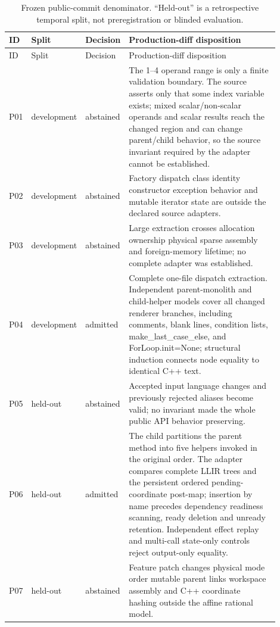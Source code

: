 \begin{longtable}{@{}p{0.055\linewidth}p{0.13\linewidth}p{0.13\linewidth}p{0.585\linewidth}@{}}
\caption{Frozen public-commit denominator. ``Held-out'' is a retrospective temporal split, not preregistration or blinded evaluation.}\label{tab:public-corpus}\\
\toprule ID & Split & Decision & Production-diff disposition\\\midrule\endfirsthead
\toprule ID & Split & Decision & Production-diff disposition\\\midrule\endhead
\bottomrule\endfoot
P01 & development & abstained & The 1--4 operand range is only a finite validation boundary. The source asserts only that some index variable exists; mixed scalar/non-scalar operands and scalar results reach the changed region and can change parent/child behavior, so the source invariant required by the adapter cannot be established.\\
P02 & development & abstained & Factory dispatch class identity constructor exception behavior and mutable iterator state are outside the declared source adapters.\\
P03 & development & abstained & Large extraction crosses allocation ownership physical sparse assembly and foreign-memory lifetime; no complete adapter was established.\\
P04 & development & admitted & Complete one-file dispatch extraction. Independent parent-monolith and child-helper models cover all changed renderer branches, including comments, blank lines, condition lists, make\_last\_case\_else, and ForLoop.init=None; structural induction connects node equality to identical C++ text.\\
P05 & held-out & abstained & Accepted input language changes and previously rejected aliases become valid; no invariant made the whole public API behavior preserving.\\
P06 & held-out & admitted & The child partitions the parent method into five helpers invoked in the original order. The adapter compares complete LLIR trees and the persistent ordered pending-coordinate post-map; insertion by name precedes dependency readiness scanning, ready deletion and unready retention. Independent effect replay and multi-call state-only controls reject output-only equality.\\
P07 & held-out & abstained & Feature patch changes physical mode order mutable parent links workspace assembly and C++ coordinate hashing outside the affine rational model.\\

\end{longtable}
